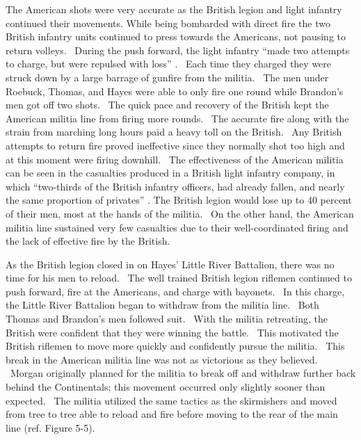 The American shots were very accurate as the British legion and light infantry
continued their movements.  While being bombarded with direct fire the two
British infantry units continued to press towards the Americans, not pausing to
return volleys.  During the push forward, the light infantry “made two attempts
to charge, but were repulsed with loss” \cite[p.92]{babits_devil_2001}.  Each time they charged
they were struck down by a large barrage of gunfire from the militia.  The men
under Roebuck, Thomas, and Hayes were able to only fire one round while
Brandon’s men got off two shots.  The quick pace and recovery of the British
kept the American militia line from firing more rounds.  The accurate fire along
with the strain from marching long hours paid a heavy toll on the British.  Any
British attempts to return fire proved ineffective since they normally shot too
high and at this moment were firing downhill.  The effectiveness of the American
militia can be seen in the casualties produced in a British light infantry
company, in which “two-thirds of the British infantry officers, had already
fallen, and nearly the same proportion of privates”
\cite[p.92]{babits_devil_2001}.  The British
legion would lose up to 40 percent of their men, most at the hands of the
militia.  On the other hand, the American militia line sustained very few
casualties due to their well-coordinated firing and the lack of effective fire
by the British.

As the British legion closed in on Hayes’ Little River Battalion, there was no
time for his men to reload.  The well trained British legion riflemen continued
to push forward, fire at the Americans, and charge with bayonets.  In this
charge, the Little River Battalion began to withdraw from the militia line.
 Both Thomas and Brandon’s men followed suit.  With the militia retreating, the
British were confident that they were winning the battle.  This motivated the
British riflemen to move more quickly and confidently pursue the militia.  This
break in the American militia line was not as victorious as they believed.
 Morgan originally planned for the militia to break off and withdraw further
back behind the Continentals; this movement occurred only slightly sooner than
expected.  The militia utilized the same tactics as the skirmishers and moved
from tree to tree able to reload and fire before moving to the rear of the main
line (ref. Figure 5-5).

